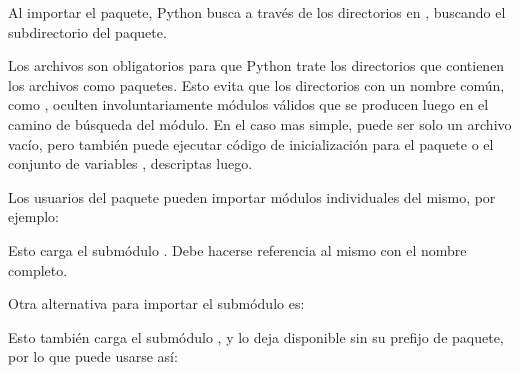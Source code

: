\documentclass[a5paper,10pt,spanish]{sphinxmanual}
\begin{document}
\sphinxAtStartPar
Al importar el paquete, Python busca a través de los directorios en , buscando el sub\sphinxhyphen{}directorio del paquete.

\sphinxAtStartPar
Los archivos  son obligatorios para que Python trate los directorios que contienen los archivos como paquetes.  Esto evita que los directorios con un nombre común, como , oculten involuntariamente módulos válidos que se producen luego en el camino de búsqueda del módulo. En el caso mas simple,  puede ser solo un archivo vacío, pero también puede ejecutar código de inicialización para el paquete o el conjunto de variables , descriptas luego.

\sphinxAtStartPar
Los usuarios del paquete pueden importar módulos individuales del mismo, por ejemplo:

\begin{sphinxVerbatim}[commandchars=\\\{\}]
 
\end{sphinxVerbatim}

\sphinxAtStartPar
Esto carga el submódulo .  Debe hacerse referencia al mismo con el nombre completo.

\begin{sphinxVerbatim}[commandchars=\\\{\}]
   
\end{sphinxVerbatim}

\sphinxAtStartPar
Otra alternativa para importar el submódulo es:

\begin{sphinxVerbatim}[commandchars=\\\{\}]
   
\end{sphinxVerbatim}

\sphinxAtStartPar
Esto también carga el submódulo , y lo deja disponible sin su prefijo de paquete, por lo que puede usarse así:
\end{document}
